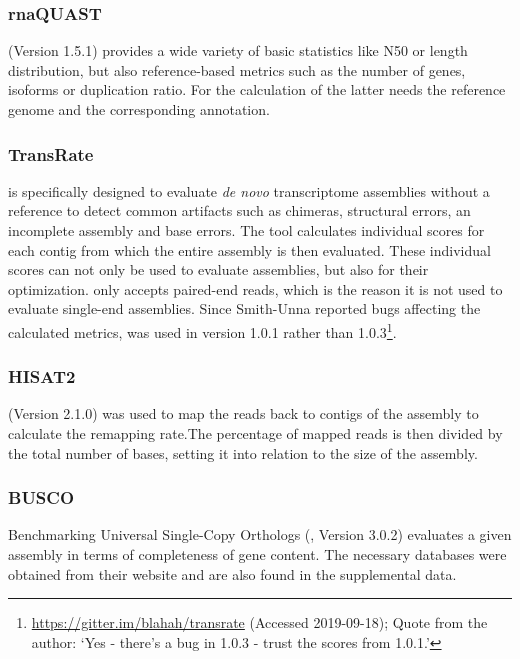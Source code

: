 \documentclass[12pt,a4paper,english]{article}
\begin{document}
\subsubsection*{rnaQUAST}
	\rnaquast (Version 1.5.1) \citep{rnaQUAST:16} provides a wide variety of basic statistics like N50 or length distribution, but also reference-based metrics such as the number of genes, isoforms or duplication ratio. For the calculation of the latter \rnaquast needs the reference genome and the corresponding annotation.

\subsubsection*{TransRate}
	\transrate \citep{TransRate:16} is specifically designed to evaluate \textit{de novo} transcriptome assemblies without a reference to detect common artifacts such as chimeras, structural errors, an incomplete assembly and base errors. The tool calculates individual scores for each contig from which the entire assembly is then evaluated. These individual scores can not only be used to evaluate assemblies, but also for their optimization. \transrate only accepts paired-end reads, which is the reason it is not used to evaluate single-end assemblies.
	Since Smith-Unna reported bugs affecting the calculated metrics, \transrate was used in version 1.0.1 rather than 1.0.3\footnote{\href{https://gitter.im/blahah/transrate}{https://gitter.im/blahah/transrate} (Accessed 2019-09-18); Quote from the author: `Yes - there's a bug in 1.0.3 - trust the scores from 1.0.1.'}.
	

\subsubsection*{HISAT2}
	\hisat (Version 2.1.0) \citep{hisat2:15} was used to map the reads back to contigs of the assembly to calculate the remapping rate.The percentage of mapped reads is then divided by the total number of bases, setting it into relation to the size of the assembly.

\subsubsection*{BUSCO}
	Benchmarking Universal Single-Copy Orthologs (\busco, Version 3.0.2) \citep{busco:15,busco:18} evaluates a given assembly in terms of completeness of gene content. The necessary databases were obtained from their website and are also found in the supplemental data.
\end{document}
